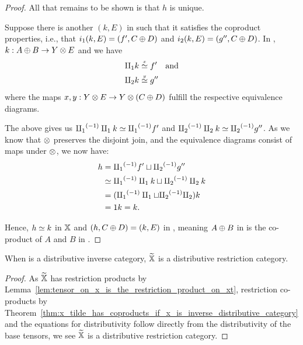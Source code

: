 \begin{proof}
  All that remains to be shown is that $h$ is unique.

  Suppose there is another $(k,E)$ in \Xt such that it satisfies the coproduct properties, i.e.,
  that $i_1 (k,E) = (f',C\oplus D)$ and $i_2 (k,E) = (g'',C\oplus D)$. In \X, $k:A\oplus B \to Y \otimes E$ and we have
  \begin{align*}
    \amalg_{1} k &\overset{\scriptscriptstyle x}{\simeq} f'\quad\text{and}\\
    \amalg_{2} k &\overset{\scriptscriptstyle y}{\simeq} g''
  \end{align*}
  where the maps $x, y: Y\otimes E \to Y\otimes(C\oplus D)$ fulfill the respective equivalence diagrams.

  The above gives us ${\amalg_{1}}^{(-1)}\amalg_{1} k \overset{\scriptscriptstyle }{\simeq} {\amalg_{1}}^{(-1)} f'$ and ${\amalg_{2}}^{(-1)}\amalg_{2} k \overset{\scriptscriptstyle }{\simeq} {\amalg_{2}}^{(-1)} g''$.
  As we know that $\otimes$ preserves the disjoint join, and the equivalence diagrams consist of maps
  under $\otimes$, we now have:
  \begin{align*}
    h&={\amalg_{1}}^{(-1)} f' \sqcup {\amalg_{2}}^{(-1)} g''\\
    &\overset{\scriptscriptstyle }{\simeq} {\amalg_{1}}^{(-1)}\amalg_{1} k \sqcup {\amalg_{2}}^{(-1)}\amalg_{2} k\\
    &= ({\amalg_{1}}^{(-1)}\amalg_{1}  \sqcup {\amalg_{2}}^{(-1)}\amalg_{2}) k\\
    &= 1 k = k.
  \end{align*}

  Hence, $h \overset{\scriptscriptstyle }{\simeq} k$ in $\mathbb{X}$ and $(h, C\oplus D) = (k,E)$ in \Xt, meaning
 $A\oplus B$ in \X is the co-product of $A$ and $B$ in \Xt.
\end{proof}

\begin{corollary}\label{cor:xt_is_a_distributive_restriction_category}
  When \X is a distributive inverse category, $\widetilde{\mathbb{X}}$ is a distributive restriction category.
\end{corollary}
\begin{proof}
  As $\widetilde{\mathbb{X}}$ has restriction products by Lemma~\ref{lem:tensor_on_x_is_the_restriction_product_on_xt},
  restriction co-products by
  Theorem~\ref{thm:x_tilde_has_coproducts_if_x_is_inverse_distributive_category} and the equations
  for distributivity follow directly from the distributivity of the base tensors, we see $\widetilde{\mathbb{X}}$ is a
  distributive restriction category.
\end{proof}

